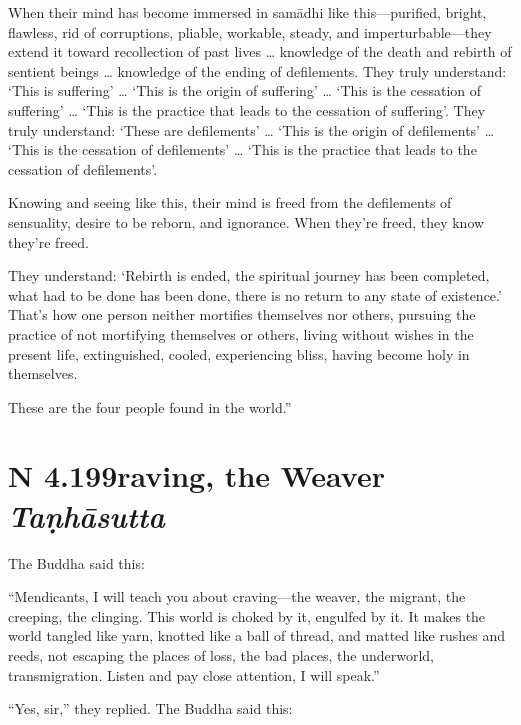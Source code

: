 \documentclass[12pt,openany]{book}%
\newcommand*{\suttatitleacronym}[1]{\smaller[2]{#1}\vspace*{.3em}}
\newcommand*{\suttatitletranslation}[1]{\linebreak{#1}}
\newcommand*{\suttatitleroot}[1]{\linebreak\smaller[2]\itshape{#1}}
\newcommand*{\tocacronym}[1]{\hspace*{-3.3em}{#1}\quad}
\newcommand*{\toctranslation}[1]{#1}
\newcommand*{\tocroot}[1]{(\textit{#1})}
\begin{document}
When their mind has become immersed in \textsanskrit{samādhi} like this—purified, bright, flawless, rid of corruptions, pliable, workable, steady, and imperturbable—they extend it toward recollection of past lives … knowledge of the death and rebirth of sentient beings … knowledge of the ending of defilements. They truly understand: ‘This is suffering’ … ‘This is the origin of suffering’ … ‘This is the cessation of suffering’ … ‘This is the practice that leads to the cessation of suffering’. They truly understand: ‘These are defilements’ … ‘This is the origin of defilements’ … ‘This is the cessation of defilements’ … ‘This is the practice that leads to the cessation of defilements’. 

Knowing and seeing like this, their mind is freed from the defilements of sensuality, desire to be reborn, and ignorance. When they’re freed, they know they’re freed. 

They understand: ‘Rebirth is ended, the spiritual journey has been completed, what had to be done has been done, there is no return to any state of existence.’ That’s how one person neither mortifies themselves nor others, pursuing the practice of not mortifying themselves or others, living without wishes in the present life, extinguished, cooled, experiencing bliss, having become holy in themselves. 

These are the four people found in the world.” 

%
\section*{{\suttatitleacronym AN 4.199}{\suttatitletranslation Craving, the Weaver }{\suttatitleroot Taṇhāsutta}}
\addcontentsline{toc}{section}{\tocacronym{AN 4.199} \toctranslation{Craving, the Weaver } \tocroot{Taṇhāsutta}}

The Buddha said this: 

“Mendicants, I will teach you about craving—the weaver, the migrant, the creeping, the clinging. This world is choked by it, engulfed by it. It makes the world tangled like yarn, knotted like a ball of thread, and matted like rushes and reeds, not escaping the places of loss, the bad places, the underworld, transmigration. Listen and pay close attention, I will speak.” 

“Yes, sir,” they replied. The Buddha said this: 
\end{document}
